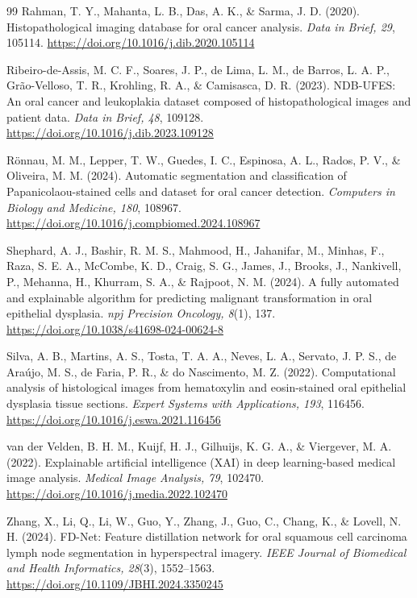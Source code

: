 \documentclass[10pt,twocolumn]{article}
\begin{document}
\begin{thebibliography}{99}
Rahman, T. Y., Mahanta, L. B., Das, A. K., \& Sarma, J. D. (2020). Histopathological imaging database for oral cancer analysis. \textit{Data in Brief, 29}, 105114. \url{https://doi.org/10.1016/j.dib.2020.105114}

Ribeiro-de-Assis, M. C. F., Soares, J. P., de Lima, L. M., de Barros, L. A. P., Gr\~ao-Velloso, T. R., Krohling, R. A., \& Camisasca, D. R. (2023). NDB-UFES: An oral cancer and leukoplakia dataset composed of histopathological images and patient data. \textit{Data in Brief, 48}, 109128. \url{https://doi.org/10.1016/j.dib.2023.109128}

R\"onnau, M. M., Lepper, T. W., Guedes, I. C., Espinosa, A. L., Rados, P. V., \& Oliveira, M. M. (2024). Automatic segmentation and classification of Papanicolaou-stained cells and dataset for oral cancer detection. \textit{Computers in Biology and Medicine, 180}, 108967. \url{https://doi.org/10.1016/j.compbiomed.2024.108967}

Shephard, A. J., Bashir, R. M. S., Mahmood, H., Jahanifar, M., Minhas, F., Raza, S. E. A., McCombe, K. D., Craig, S. G., James, J., Brooks, J., Nankivell, P., Mehanna, H., Khurram, S. A., \& Rajpoot, N. M. (2024). A fully automated and explainable algorithm for predicting malignant transformation in oral epithelial dysplasia. \textit{npj Precision Oncology, 8}(1), 137. \url{https://doi.org/10.1038/s41698-024-00624-8}

Silva, A. B., Martins, A. S., Tosta, T. A. A., Neves, L. A., Servato, J. P. S., de Ara\'ujo, M. S., de Faria, P. R., \& do Nascimento, M. Z. (2022). Computational analysis of histological images from hematoxylin and eosin-stained oral epithelial dysplasia tissue sections. \textit{Expert Systems with Applications, 193}, 116456. \url{https://doi.org/10.1016/j.eswa.2021.116456}

van der Velden, B. H. M., Kuijf, H. J., Gilhuijs, K. G. A., \& Viergever, M. A. (2022). Explainable artificial intelligence (XAI) in deep learning-based medical image analysis. \textit{Medical Image Analysis, 79}, 102470. \url{https://doi.org/10.1016/j.media.2022.102470}

Zhang, X., Li, Q., Li, W., Guo, Y., Zhang, J., Guo, C., Chang, K., \& Lovell, N. H. (2024). FD-Net: Feature distillation network for oral squamous cell carcinoma lymph node segmentation in hyperspectral imagery. \textit{IEEE Journal of Biomedical and Health Informatics, 28}(3), 1552--1563. \url{https://doi.org/10.1109/JBHI.2024.3350245}

\end{thebibliography}
\end{document}
